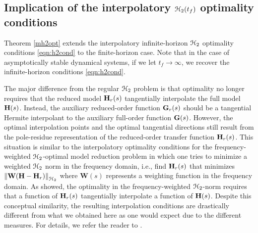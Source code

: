 \documentclass[twocolumn]{autart}
\begin{document}
\subsection{Implication of the interpolatory $\EuScript{H}_2({t_f})$ optimality conditions}
\label{sec:discuss}
Theorem \ref{mh2opt} extends the interpolatory infinite-horizon $\EuScript{H}_2$ optimality conditions \eqref{eqn:h2cond} to the finite-horizon case. Note that in the case of asymptotically stable dynamical systems, if we let $t_f \to \infty$, we recover the infinite-horizon conditions  \eqref{eqn:h2cond}.

 The major difference from the regular $\EuScript{H}_2$ problem is that  optimality no longer requires that the reduced model $\mathbf{H}_r(s)$ tangentially interpolate the full model $\mathbf{H}(s)$. Instead, the auxiliary reduced-order function $\mathbf{G}_r(s)$ should be a tangential Hermite interpolant to the auxiliary  full-order  function $\mathbf{G}(s)$. However, the optimal interpolation points and the optimal tangential directions still result from the pole-residue representation of the reduced-order transfer function $\mathbf{H}_r(s)$. This situation is  similar to the interpolatory optimality conditions for the  frequency-weighted $\EuScript{H}_2$-optimal model reduction problem in which  one tries to minimize a weighted $\EuScript{H}_2$ norm in the frequency domain, i.e.,
find $\mathbf{H}_r(s)$ that minimizes $ \left\lVert \mathbf{W} ( \mathbf{H} - \mathbf{H}_r) \right\rVert_{\EuScript{H}_2}$ where $\mathbf{W}(s)$ represents a weighting function in the frequency domain. As \cite{breiten2013near} showed, the optimality  
in the frequency-weighted $\EuScript{H}_2$-norm requires that a function of $\mathbf{H}_r(s)$ tangentially interpolate
a function of  $\mathbf{H}(s)$. Despite this  conceptual similarity, the resulting interpolation conditions are drastically different from what we obtained here as one would expect due to the different measures. For details, we refer the reader to  \cite{breiten2013near}.
\end{document}
